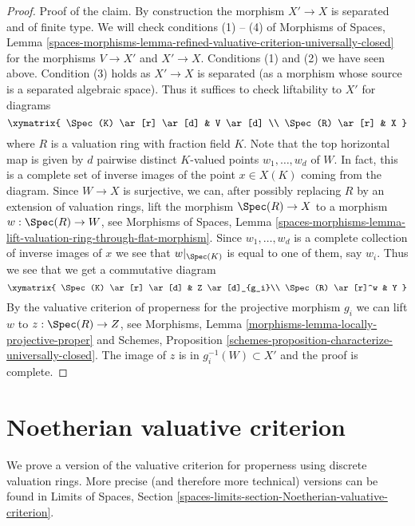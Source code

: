 \begin{proof}
\medskip\noindent
Proof of the claim. By construction the morphism $X' \to X$ is separated
and of finite type. We will check conditions (1) -- (4) of
Morphisms of Spaces, Lemma
\ref{spaces-morphisms-lemma-refined-valuative-criterion-universally-closed}
for the morphisms $V \to X'$ and $X' \to X$.
Conditions (1) and (2) we have seen above.
Condition (3) holds as $X' \to X$ is separated (as a morphism whose
source is a separated algebraic space). Thus it suffices to check
liftability to $X'$ for diagrams
$$
\xymatrix{
\Spec(K) \ar[r] \ar[d] & V \ar[d] \\
\Spec(R) \ar[r] & X
}
$$
where $R$ is a valuation ring with fraction field $K$.
Note that the top horizontal map is given by $d$ pairwise distinct
$K$-valued points $w_1, \ldots, w_d$ of $W$. In fact, this
is a complete set of inverse images of the point $x \in X(K)$
coming from the diagram. Since $W \to X$ is surjective,
we can, after possibly replacing $R$ by an extension of valuation rings,
lift the morphism $\Spec(R) \to X$ to a morphism $w : \Spec(R) \to W$, see
Morphisms of Spaces, Lemma
\ref{spaces-morphisms-lemma-lift-valuation-ring-through-flat-morphism}.
Since $w_1, \ldots, w_d$ is a complete collection of inverse images of
$x$ we see that $w|_{\Spec(K)}$ is equal to one of them, say $w_i$.
Thus we see that we get a commutative diagram
$$
\xymatrix{
\Spec(K) \ar[r] \ar[d] &  Z \ar[d]_{g_i}\\
\Spec(R) \ar[r]^w & Y
}
$$
By the valuative criterion of properness for the projective
morphism $g_i$ we can lift $w$ to $z : \Spec(R) \to Z$, see
Morphisms, Lemma \ref{morphisms-lemma-locally-projective-proper}
and
Schemes, Proposition \ref{schemes-proposition-characterize-universally-closed}.
The image of $z$ is in $g_i^{-1}(W) \subset X'$ and the proof is complete.
\end{proof}







\section{Noetherian valuative criterion}
\label{section-Noetherian-valuative-criterion}

\noindent
We prove a version of the valuative criterion for properness
using discrete valuation rings. More precise (and therefore more
technical) versions can be found in
Limits of Spaces, Section
\ref{spaces-limits-section-Noetherian-valuative-criterion}.

